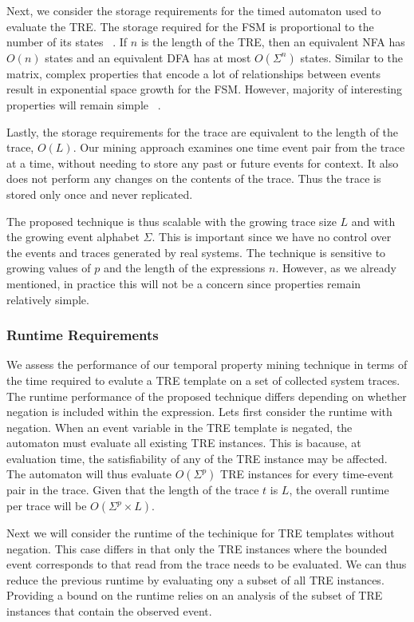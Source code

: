 \documentclass[]{sigplanconf}
\begin{document}
Next, we consider the storage requirements for the timed automaton used to evaluate the TRE.
The storage required for the FSM is proportional to the number of its states ~\cite{book1}.
If $n$ is the length of the TRE, then an equivalent NFA has $O(n)$ states and an equivalent DFA has at most $O(\Sigma^n)$ states. Similar to the matrix, complex properties that encode a lot of relationships between events result in exponential space growth for the FSM. However, majority of interesting properties will remain simple ~\cite{dwyer1999patterns}.


Lastly, the storage requirements for the trace are equivalent to the length of the trace, $O(L)$.
Our mining approach examines one time event pair from the trace at a time, without needing to
store any past or future events for context. It also does not perform any changes on the
contents of the trace. Thus the trace is stored only once and never replicated.


The proposed technique is thus scalable with the growing trace size $L$ and with the growing event alphabet $\Sigma$. This is important since we have no control over the events and traces generated by real systems. The technique is sensitive to growing values of $p$ and the length of the expressions $n$. However, as we already mentioned, in practice this will not be a concern since properties remain relatively simple.

\subsubsection{Runtime Requirements}

We assess the performance of our temporal property mining technique in terms of the time required to evalute a TRE template on a set of collected system traces.
The runtime performance of the proposed technique differs depending on whether negation is included within the expression.
Lets first consider the runtime with negation. When an event variable in the TRE template is negated, the automaton must evaluate all existing TRE instances. This is bacause, at evaluation time, the satisfiability of any of the TRE instance may be affected. The automaton will thus evaluate $O(\Sigma^p)$ TRE instances for every time-event pair in the trace. Given that the length of the trace $t$ is $L$, the overall runtime per trace will be $O(\Sigma^p \times L)$.

Next we will consider the runtime of the techinique for TRE templates without negation. This case differs in that only the TRE instances where the bounded event corresponds to that read from the trace needs to be evaluated. We can thus reduce the previous runtime by evaluating ony a subset of all TRE instances. Providing a bound on the runtime relies on an analysis of the subset of TRE instances that contain the observed event.
\end{document}
